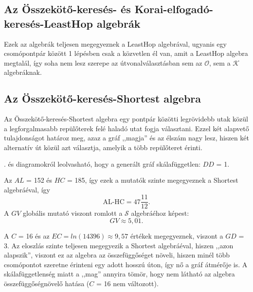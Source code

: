   \subsection{Az Összekötő-keresés- és Korai-elfogadó-keresés-LeastHop algebrák}
  Ezek az algebrák teljesen megegyeznek a LeastHop algebrával, ugyanis egy csomópontpár között 1 lépésben csak a közvetlen él van, amit a LeastHop algebra megtalál, így soha nem lesz szerepe az útvonalválasztásban sem az $\mathcal{O}$, sem a $\mathcal{K}$ algebráknak.

  \subsection{Az Összekötő-keresés-Shortest algebra}
  Az Összekötő-keresés-Shortest algebra egy pontpár közötti legrövidebb utak közül a legforgalmasabb repülőterek felé haladó utat fogja választani. Ezzel két alapvető tulajdonságot határoz meg, azaz a gráf ,,magja'' és az élszám nagy lesz, hiszen két alternatív út közül azt választja, amelyik a több repülőteret érinti.\\

  . és  diagramokról leolvasható, hogy a generált gráf skálafüggetlen: $DD$ = 1.

  Az $AL$ = 152 és $HC$ = 185, így ezek a mutatók szinte megegyeznek a Shortest algebráéval, így $$\text{AL-HC}=47\frac{11}{12}.$$ A $GV$ globális mutató viszont romlott a $\mathcal{S}$ algebráéhoz képest: $$GV \approx 5,01.$$

  A $C$ = 16 és az $EC = ln(14396) \approx 9,57$ értékek megegyeznek, viszont a $GD$ = 3. Az eloszlás szinte teljesen megegyezik a Shortest algebráéval, hiszen ,,azon alapszik'', viszont ez az algebra az összefüggőséget növeli, hiszen minél több csomópontot szeretne érinteni egy adott hosszú úton, így nő a gráf átmérője is. A skálafüggetlenség miatt a ,,mag'' annyira tömör, hogy nem látható az algebra összefüggőségnövelő hatása ($C$ = 16 nem változott).

